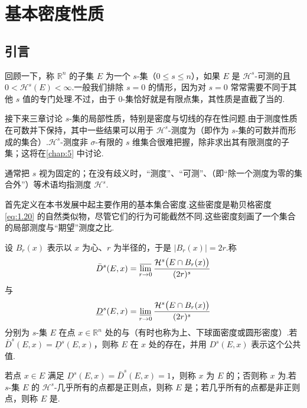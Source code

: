 
\chapter{基本密度性质}\label{chap:2}

\section{引言}

回顾一下，称 $\mathbb{R}^n$ 的子集 $E$ 为一个 $s$-集（$0\leq s\leq n$），如果 $E$ 是 $\mathcal{H}^s$-可测的且 $0<\mathcal{H}^s(E)<\infty$.一般我们排除 $s=0$ 的情形，因为对 $s=0$ 常常需要不同于其他 $s$ 值的专门处理.不过，由于 $0$-集恰好就是有限点集，其性质是直截了当的.

接下来三章讨论 $s$-集的局部性质，特别是密度与切线的存在性问题.由于测度性质在可数并下保持，其中一些结果可以用于 $\mathcal{H}^s$-测度为（即作为 $s$-集的可数并而形成的集合）.$\mathcal{H}^s$-测度非 $\sigma$-有限的 $s$ 维集合很难把握，除非求出其有限测度的子集；这将在\cref{chap:5} 中讨论.

通常把 $s$ 视为固定的；在没有歧义时，``测度''、``可测''、（即``除一个测度为零的集合外''）等术语均指测度 $\mathcal{H}^s$.

首先定义在本书发展中起主要作用的基本集合密度.这些密度是勒贝格密度 \eqref{eq:1.20} 的自然类似物，尽管它们的行为可能截然不同.这些密度刻画了一个集合的局部测度与``期望''测度之比.

设 $B_r(x)$ 表示以 $x$ 为心、$r$ 为半径的，于是 $|B_r(x)|=2r$.称
\[
  \bar{D}^{s}(E,x)=\varlimsup_{r\to 0}\frac{\mathcal{H}^{s}\bigl(E\cap B_r(x)\bigr)}{(2r)^{s}}
\]
与
\[
  \underline{D}^{s}(E,x)=\varliminf_{r\to 0}\frac{\mathcal{H}^{s}\bigl(E\cap B_r(x)\bigr)}{(2r)^{s}}
\]
分别为 $s$-集 $E$ 在点 $x\in\mathbb{R}^n$ 处的与（有时也称为上、下球面密度或圆形密度）.若 $\bar{D}^s(E,x)=\underline{D}^s(E,x)$，则称 $E$ 在 $x$ 处的存在，并用 $D^s(E,x)$ 表示这个公共值.

若点 $x\in E$ 满足 $\underline{D}^s(E,x)=\bar{D}^s(E,x)=1$，则称 $x$ 为 $E$ 的；否则称 $x$ 为.若 $s$-集 $E$ 的 $\mathcal{H}^s$-几乎所有的点都是正则点，则称 $E$ 是；若几乎所有的点都是非正则点，则称 $E$ 是.

